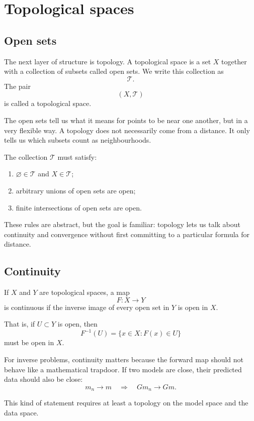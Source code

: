 \documentclass[11pt,a4paper]{book}
\newcommand{\G}{G}
\begin{document}
\section{Topological spaces}

\subsection{Open sets}

The next layer of structure is topology. A topological space is a set $X$
together with a collection of subsets called open sets. We write this collection
as
\[
    \mathcal{T}.
\]
The pair
\[
    (X,\mathcal{T})
\]
is called a topological space.

The open sets tell us what it means for points to be near one another, but in a
very flexible way. A topology does not necessarily come from a distance. It only
tells us which subsets count as neighbourhoods.

The collection $\mathcal{T}$ must satisfy:
\begin{enumerate}[label=\arabic*.]
    \item $\varnothing \in \mathcal{T}$ and $X\in\mathcal{T}$;
    \item arbitrary unions of open sets are open;
    \item finite intersections of open sets are open.
\end{enumerate}

These rules are abstract, but the goal is familiar: topology lets us talk about
continuity and convergence without first committing to a particular formula for
distance.

\subsection{Continuity}

If $X$ and $Y$ are topological spaces, a map
\[
    F:X\to Y
\]
is continuous if the inverse image of every open set in $Y$ is open in $X$.

That is, if $U\subset Y$ is open, then
\[
    F^{-1}(U)
    =
    \{x\in X : F(x)\in U\}
\]
must be open in $X$.

For inverse problems, continuity matters because the forward map should not
behave like a mathematical trapdoor. If two models are close, their predicted
data should also be close:
\[
    m_n \to m
    \quad\Longrightarrow\quad
    \G m_n \to \G m.
\]

This kind of statement requires at least a topology on the model space and the
data space.
\end{document}
